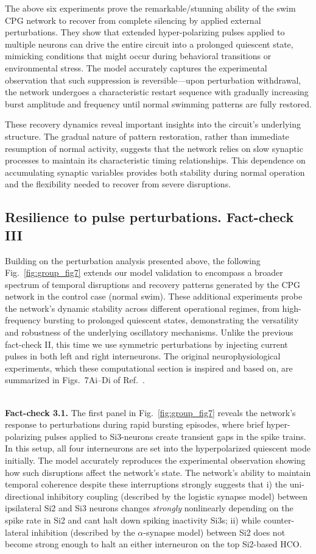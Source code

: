 \documentclass[nofootinbib,aip,amsmath,amssymb,reprint,twocolumn,10pt]{revtex4-2}
\begin{document}
The above six experiments prove  the remarkable/stunning ability of the swim CPG network to recover from complete silencing by applied external perturbations. They show that extended hyper-polarizing pulses applied to multiple neurons can drive the entire circuit into a prolonged quiescent state, mimicking conditions that might occur during behavioral transitions or environmental stress. The model accurately captures the experimental observation that such suppression is reversible—upon perturbation withdrawal, the network undergoes a characteristic restart sequence with gradually increasing burst amplitude and frequency until normal swimming patterns are fully restored.

These recovery dynamics reveal important insights into the circuit's underlying structure. The gradual nature of pattern restoration, rather than immediate resumption of normal activity, suggests that the network relies on slow synaptic processes to maintain its characteristic timing relationships. This dependence on accumulating synaptic variables provides both stability during normal operation and the flexibility needed to recover from severe disruptions.


\subsection{Resilience to pulse perturbations. Fact-check III}
% 
Building on the perturbation analysis presented above, the following Fig.~\ref{fig:group_fig7} extends our model validation to encompass a broader spectrum of temporal disruptions and recovery patterns generated by the CPG network in the control case (normal swim). These additional experiments probe the network's dynamic stability across different operational regimes, from high-frequency bursting to prolonged quiescent states, demonstrating the versatility and robustness of the underlying oscillatory mechanisms. Unlike the previous fact-check II, this time we use symmetric perturbations by injecting current pulses in both left and right interneurons. The original neurophysiological experiments, which these computational section is inspired and based on, are summarized in Figs.~7Ai–Di of Ref.~\cite{SakuraiKatz2016}.

~\\
{\bf Fact-check 3.1.} The first panel in Fig.~\ref{fig:group_fig7} reveals the network's response to perturbations during rapid bursting episodes, where brief hyper-polarizing pulses applied to Si3-neurons create transient gaps in the spike trains. In this setup, all four interneurons are set into the hyperpolarized quiescent mode initially. The model accurately reproduces the experimental observation showing how such disruptions affect the network's state. The network's ability to maintain temporal coherence despite these interruptions strongly suggests that i)  the uni-directional inhibitory coupling (described by the logistic synapse model) between ipsilateral Si2 and Si3 neurons changes {\em strongly} nonlinearly depending on the spike rate in Si2 and cant halt down spiking inactivity Si3s; ii) while counter-lateral inhibition (described by the $\alpha$-synapse model) between Si2 does not become strong enough to halt an either interneuron on the top Si2-based HCO. 
\end{document}
